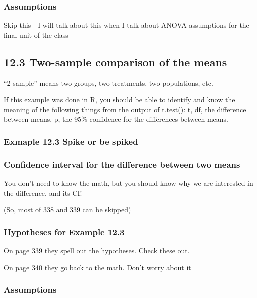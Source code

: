 \documentclass[]{book}
\theoremstyle{definition}
\theoremstyle{definition}
\theoremstyle{definition}
\theoremstyle{remark}
\begin{document}
\subsubsection{Assumptions}\label{assumptions}

Skip this - I will talk about this when I talk about ANOVA assumptions
for the final unit of the class

\subsection{12.3 Two-sample comparison of the
means}\label{two-sample-comparison-of-the-means}

``2-sample'' means two groups, two treatments, two populations, etc.

If this example was done in R, you should be able to identify and know
the meaning of the following things from the output of t.test(): t, df,
the difference between means, p, the 95\% confidence for the differences
between means.

\subsubsection{Exmaple 12.3 Spike or be
spiked}\label{exmaple-12.3-spike-or-be-spiked}

\subsubsection{Confidence interval for the difference between two
means}\label{confidence-interval-for-the-difference-between-two-means}

You don't need to know the math, but you should know why we are
interested in the difference, and its CI!

(So, most of 338 and 339 can be skipped)

\subsubsection{Hypotheses for Example
12.3}\label{hypotheses-for-example-12.3}

On page 339 they spell out the hypotheses. Check these out.

On page 340 they go back to the math. Don't worry about it

\subsubsection{Assumptions}\label{assumptions-1}
\end{document}
